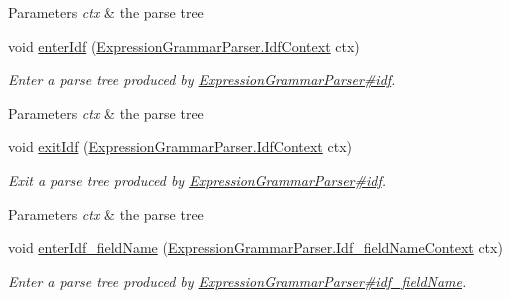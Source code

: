 \begin{DoxyCompactItemize}
\begin{DoxyCompactList}
\begin{DoxyParams}{Parameters}
{\em ctx} & the parse tree\\
\hline
\end{DoxyParams}
 \end{DoxyCompactList}\item 
void \hyperlink{classgov_1_1nasa_1_1jpf_1_1inspector_1_1server_1_1expression_1_1parser_1_1_expression_grammar_base_listener_a4ac8fb54fe3090b5c5599fbc7a60978c}{enter\+Idf} (\hyperlink{classgov_1_1nasa_1_1jpf_1_1inspector_1_1server_1_1expression_1_1parser_1_1_expression_grammar_parser_1_1_idf_context}{Expression\+Grammar\+Parser.\+Idf\+Context} ctx)
\begin{DoxyCompactList}\small\item\em Enter a parse tree produced by \hyperlink{classgov_1_1nasa_1_1jpf_1_1inspector_1_1server_1_1expression_1_1parser_1_1_expression_grammar_parser_a47871267e7740d706a8557ca249a0f1e}{Expression\+Grammar\+Parser\#idf}.


\begin{DoxyParams}{Parameters}
{\em ctx} & the parse tree\\
\hline
\end{DoxyParams}
 \end{DoxyCompactList}\item 
void \hyperlink{classgov_1_1nasa_1_1jpf_1_1inspector_1_1server_1_1expression_1_1parser_1_1_expression_grammar_base_listener_a00d98a427b763574a058edd33a1aed47}{exit\+Idf} (\hyperlink{classgov_1_1nasa_1_1jpf_1_1inspector_1_1server_1_1expression_1_1parser_1_1_expression_grammar_parser_1_1_idf_context}{Expression\+Grammar\+Parser.\+Idf\+Context} ctx)
\begin{DoxyCompactList}\small\item\em Exit a parse tree produced by \hyperlink{classgov_1_1nasa_1_1jpf_1_1inspector_1_1server_1_1expression_1_1parser_1_1_expression_grammar_parser_a47871267e7740d706a8557ca249a0f1e}{Expression\+Grammar\+Parser\#idf}.


\begin{DoxyParams}{Parameters}
{\em ctx} & the parse tree\\
\hline
\end{DoxyParams}
 \end{DoxyCompactList}\item 
void \hyperlink{classgov_1_1nasa_1_1jpf_1_1inspector_1_1server_1_1expression_1_1parser_1_1_expression_grammar_base_listener_a124f8fa57ab611dbb37f39cc64208898}{enter\+Idf\+\_\+field\+Name} (\hyperlink{classgov_1_1nasa_1_1jpf_1_1inspector_1_1server_1_1expression_1_1parser_1_1_expression_grammar_pad53202cd69742416986508e382be2265}{Expression\+Grammar\+Parser.\+Idf\+\_\+field\+Name\+Context} ctx)
\begin{DoxyCompactList}\small\item\em Enter a parse tree produced by \hyperlink{classgov_1_1nasa_1_1jpf_1_1inspector_1_1server_1_1expression_1_1parser_1_1_expression_grammar_parser_a6123d29ed4ca503a4952f04ea9e7a81f}{Expression\+Grammar\+Parser\#idf\+\_\+field\+Name}.



\end{DoxyCompactList}
\end{DoxyCompactItemize}
